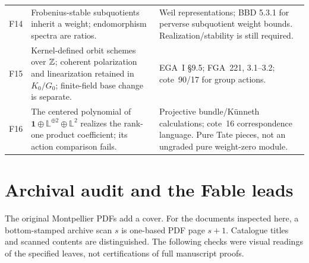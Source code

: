 \documentclass[11pt,a4paper]{article}
\theoremstyle{named}\newtheorem{finding}{Finding}[section]
\theoremstyle{definition}\newtheorem{definition}[finding]{Definition}
\theoremstyle{remark}\newtheorem{remark}[finding]{Remark}
\begin{document}
{\begin{longtable}{p{.12\linewidth}p{.48\linewidth}p{.32\linewidth}}
F14&Frobenius-stable subquotients inherit a weight; endomorphism spectra are ratios.&Weil representations; BBD 5.3.1 for perverse subquotient weight bounds. Realization/stability is still required.\\
F15&Kernel-defined orbit schemes over $\mathbb Z$; coherent polarization and linearization retained in $K_0/G_0$; finite-field base change is separate.&EGA~I \S9.5; FGA~221, 3.1--3.2; cote~90/17 for group actions.\\
F16&The centered polynomial of $\mathbf1\oplus\mathbb L^{\oplus2}\oplus\mathbb L^2$ realizes the rank-one product coefficient; its action comparison fails.&Projective bundle/K\"unneth calculations; cote~16 correspondence language. Pure Tate pieces, not an ungraded pure weight-zero module.\\\bottomrule
\end{longtable}}

\section{Archival audit and the Fable leads}\label{sec:archive}
The original Montpellier PDFs add a cover. For the documents inspected here, a bottom-stamped archive scan $s$ is one-based PDF page $s+1$. Catalogue titles and scanned contents are distinguished. The following checks were visual readings of the specified leaves, not certifications of full manuscript proofs.
\end{document}
